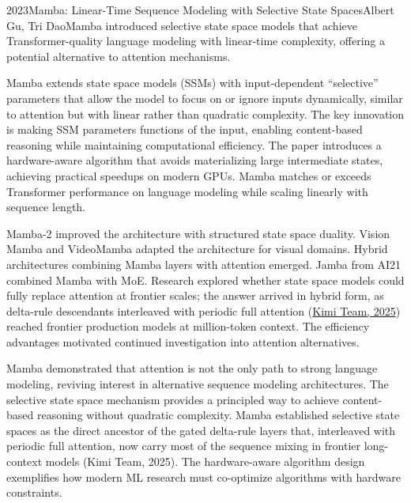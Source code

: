 
\begin{papersummary}{2023}{Mamba: Linear-Time Sequence Modeling with Selective State Spaces}{Albert Gu, Tri Dao}{Mamba introduced selective state space models that achieve Transformer-quality language modeling with linear-time complexity, offering a potential alternative to attention mechanisms.}

Mamba extends state space models (SSMs) with input-dependent ``selective'' parameters that allow the model to focus on or ignore inputs dynamically, similar to attention but with linear rather than quadratic complexity. The key innovation is making SSM parameters functions of the input, enabling content-based reasoning while maintaining computational efficiency. The paper introduces a hardware-aware algorithm that avoids materializing large intermediate states, achieving practical speedups on modern GPUs. Mamba matches or exceeds Transformer performance on language modeling while scaling linearly with sequence length.

Mamba-2 improved the architecture with structured state space duality. Vision Mamba and VideoMamba adapted the architecture for visual domains. Hybrid architectures combining Mamba layers with attention emerged. Jamba from AI21 combined Mamba with MoE. Research explored whether state space models could fully replace attention at frontier scales; the answer arrived in hybrid form, as delta-rule descendants interleaved with periodic full attention (\hyperref[paper:kimi-2025-linear]{Kimi Team, 2025}) reached frontier production models at million-token context. The efficiency advantages motivated continued investigation into attention alternatives.

Mamba demonstrated that attention is not the only path to strong language modeling, reviving interest in alternative sequence modeling architectures. The selective state space mechanism provides a principled way to achieve content-based reasoning without quadratic complexity. Mamba established selective state spaces as the direct ancestor of the gated delta-rule layers that, interleaved with periodic full attention, now carry most of the sequence mixing in frontier long-context models (Kimi Team, 2025). The hardware-aware algorithm design exemplifies how modern ML research must co-optimize algorithms with hardware constraints.

\end{papersummary}
